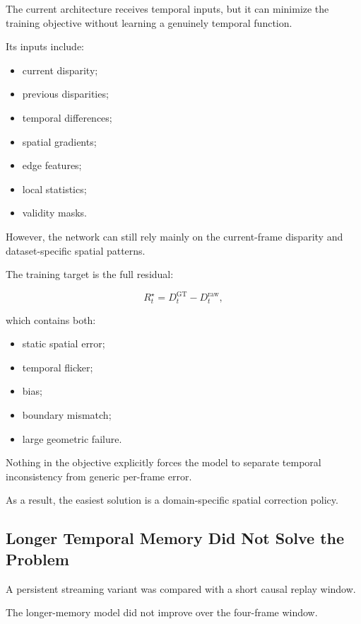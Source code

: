 \documentclass[11pt,a4paper]{article}
\begin{document}
The current architecture receives temporal inputs, but it can minimize the training
objective without learning a genuinely temporal function.

Its inputs include:

\begin{itemize}[leftmargin=*]
    \item current disparity;
    \item previous disparities;
    \item temporal differences;
    \item spatial gradients;
    \item edge features;
    \item local statistics;
    \item validity masks.
\end{itemize}

However, the network can still rely mainly on the current-frame disparity and
dataset-specific spatial patterns.

The training target is the full residual:

\begin{equation}
R_t^{\star}
=
D_t^{\mathrm{GT}}
-
D_t^{\mathrm{raw}},
\end{equation}

which contains both:

\begin{itemize}[leftmargin=*]
    \item static spatial error;
    \item temporal flicker;
    \item bias;
    \item boundary mismatch;
    \item large geometric failure.
\end{itemize}

Nothing in the objective explicitly forces the model to separate temporal
inconsistency from generic per-frame error.

As a result, the easiest solution is a domain-specific spatial correction policy.

\subsection{Longer Temporal Memory Did Not Solve the Problem}

A persistent streaming variant was compared with a short causal replay window.

The longer-memory model did not improve over the four-frame window.
\end{document}
